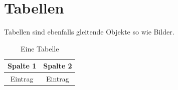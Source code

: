 \section{Tabellen}
Tabellen sind ebenfalls gleitende Objekte so wie Bilder. 
\begin{table}
	\centering
	\begin{tabular}{c|c}
		\textbf{Spalte 1} & \textbf{Spalte 2} \\
		\hline
		\hline
		Eintrag & Eintrag \\
		\hline
	\end{tabular}
	\caption{Eine Tabelle}
\end{table}